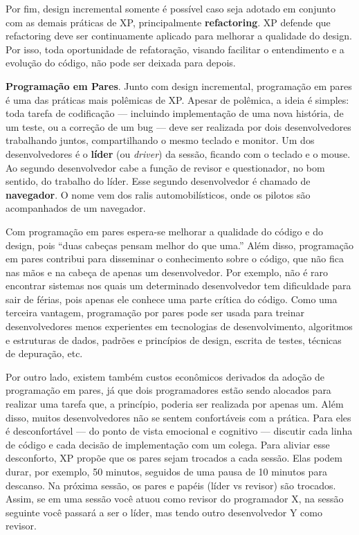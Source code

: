 \documentclass[
  11pt,
  twoside]{book}
\begin{document}
Por fim, design incremental somente é possível caso seja adotado em
conjunto com as demais práticas de XP, principalmente
\textbf{refactoring}. XP defende que refactoring deve ser continuamente
aplicado para melhorar a qualidade do design. Por isso, toda
oportunidade de refatoração, visando facilitar o entendimento e a
evolução do código, não pode ser deixada para depois.

 \textbf{Programação em Pares}. Junto com
design incremental, programação em pares é uma das práticas mais
polêmicas de XP. Apesar de polêmica, a ideia é simples: toda tarefa de
codificação --- incluindo implementação de uma nova história, de um
teste, ou a correção de um bug --- deve ser realizada por dois
desenvolvedores trabalhando juntos, compartilhando o mesmo teclado e
monitor. Um dos desenvolvedores é o \textbf{líder} (ou \emph{driver}) da
sessão, ficando com o teclado e o mouse. Ao segundo desenvolvedor cabe a
função de revisor e questionador, no bom sentido, do trabalho do líder.
Esse segundo desenvolvedor é chamado de \textbf{navegador}. O nome vem
dos ralis automobilísticos, onde os pilotos são acompanhados de um
navegador.

Com programação em pares espera-se melhorar a qualidade do código e do
design, pois ``duas cabeças pensam melhor do que uma.'' Além disso,
programação em pares contribui para disseminar o conhecimento sobre o
código, que não fica nas mãos e na cabeça de apenas um desenvolvedor.
Por exemplo, não é raro encontrar sistemas nos quais um determinado
desenvolvedor tem dificuldade para sair de férias, pois apenas ele
conhece uma parte crítica do código. Como uma terceira vantagem,
programação por pares pode ser usada para treinar desenvolvedores menos
experientes em tecnologias de desenvolvimento, algoritmos e estruturas
de dados, padrões e princípios de design, escrita de testes, técnicas de
depuração, etc.

Por outro lado, existem também custos econômicos derivados da adoção de
programação em pares, já que dois programadores estão sendo alocados
para realizar uma tarefa que, a princípio, poderia ser realizada por
apenas um. Além disso, muitos desenvolvedores não se sentem confortáveis
com a prática. Para eles é desconfortável --- do ponto de vista
emocional e cognitivo --- discutir cada linha de código e cada decisão
de implementação com um colega. Para aliviar esse desconforto, XP propõe
que os pares sejam trocados a cada sessão. Elas podem durar, por
exemplo, 50 minutos, seguidos de uma pausa de 10 minutos para descanso.
Na próxima sessão, os pares e papéis (líder vs revisor) são trocados.
Assim, se em uma sessão você atuou como revisor do programador X, na
sessão seguinte você passará a ser o líder, mas tendo outro
desenvolvedor Y como revisor.
\end{document}
